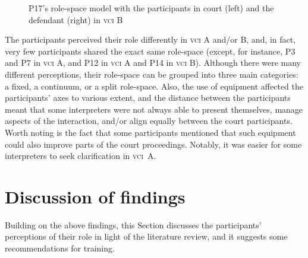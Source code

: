 \documentclass[output=paper]{langsci/langscibook}
\begin{document}
\begin{figure}
   
\caption{\label{fig:devaux:15}P17's role-space model with the participants in court (left) and the defendant (right) in \textsc{vci} B}
\end{figure}

The participants perceived their role differently in \textsc{vci} A and/or B, and, in fact, very few participants shared the exact same role-space (except, for instance, P3 and P7 in \textsc{vci} A, and P12 in \textsc{vci} A and P14 in \textsc{vci} B). Although there were many different perceptions, their role-space can be grouped into three main categories: a fixed, a continuum, or a split role-space. Also, the use of equipment affected the participants’ axes to various extent, and the distance between the participants meant that some interpreters were not always able to present themselves, manage aspects of the interaction, and/or align equally between the court participants. Worth noting is the fact that some participants mentioned that such equipment could also improve parts of the court proceedings. Notably, it was easier for some interpreters to seek clarification in \textsc{vci}~A. 

\section{Discussion of findings}
\label{sec:devaux:6}
Building on the above findings, this Section discusses the participants’ perceptions of their role in light of the literature review, and it suggests some recommendations for training.
\end{document}
